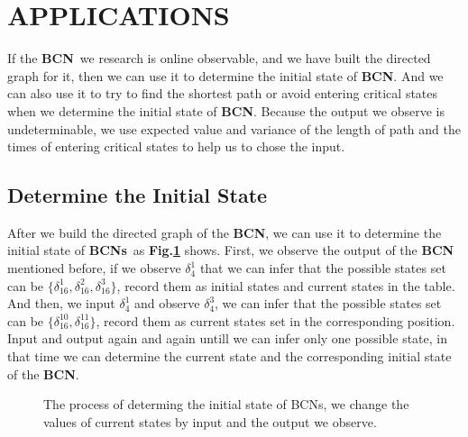 \documentclass[letterpaper, 10 pt, conference]{ieeeconf}  %
\def \BCN {{\bf BCN}}
\def \BCNs {{\bf BCNs}}
\begin{document}
\section{APPLICATIONS}

If the \BCN\ we research is online observable, and we have built the directed graph for it, then we can use  it to determine the initial state of {\bf BCN}. And we can also use it to try to find the shortest path or avoid entering critical states when we determine the initial state of {\bf BCN}. Because the output we observe is undeterminable, we use expected value and variance of the length of path and the times of entering critical states to help us to chose the input.

\subsection{Determine the Initial State}

After we build the directed graph of the {\bf BCN}, we can use it to determine the initial state of \BCNs\ as {\bf Fig.\ref{fig:5}} shows. First, we observe the output of the {\bf BCN} mentioned before, if we observe $\delta_4^1$ that we can infer that the possible states set can be $\{\delta_{16}^1,\delta_{16}^2,\delta_{16}^3\}$, record them as initial states and current states in the table. And then, we input  $\delta_4^1$ and observe  $\delta_4^3$, we can infer that the possible states set can be $\{\delta_{16}^{10},\delta_{16}^{11}\}$, record them as current states set in the corresponding position. Input and output again and again untill we can infer only one  possible state, in that time we can determine the current state and the corresponding initial state of the {\bf BCN}.

\begin{figure}[thpb]
      \centering
      
      \caption{The process of determing the initial state of BCNs, we change the values of current states by input and the output we observe. }
      \label{fig:5}
   \end{figure}
\end{document}
